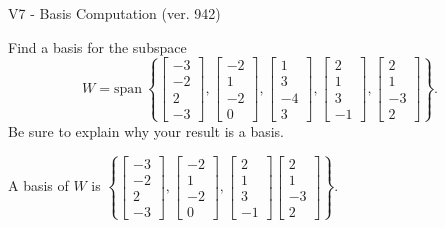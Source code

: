 \begin{exercise}
  \begin{exerciseTitle}V7 - Basis Computation (ver. 942)\end{exerciseTitle}
  \begin{exerciseStatement}
    Find a basis for the subspace 
\[W=\mathrm{span}\ \left\{\left[\begin{array}{r}
-3 \\
-2 \\
2 \\
-3
\end{array}\right] , \left[\begin{array}{r}
-2 \\
1 \\
-2 \\
0
\end{array}\right] , \left[\begin{array}{r}
1 \\
3 \\
-4 \\
3
\end{array}\right] , \left[\begin{array}{r}
2 \\
1 \\
3 \\
-1
\end{array}\right] , \left[\begin{array}{r}
2 \\
1 \\
-3 \\
2
\end{array}\right]\right\}.\]
 Be sure to explain why your result is a basis.


  \end{exerciseStatement}
  \begin{exerciseAnswer}
   A basis of \(W\) is  \(\left\{\left[\begin{array}{r}
-3 \\
-2 \\
2 \\
-3
\end{array}\right] , \left[\begin{array}{r}
-2 \\
1 \\
-2 \\
0
\end{array}\right] , \left[\begin{array}{r}
2 \\
1 \\
3 \\
-1
\end{array}\right] \left[\begin{array}{r}
2 \\
1 \\
-3 \\
2
\end{array}\right]\right\}\).
  


  \end{exerciseAnswer}
\end{exercise}